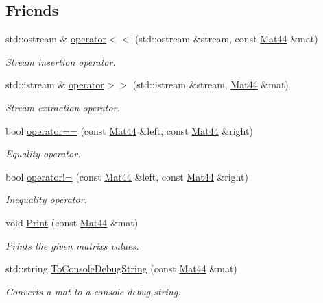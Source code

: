 \subsection*{Friends}
\begin{DoxyCompactItemize}
\item 
std\+::ostream \& \hyperlink{classgfxmath_1_1_mat44_a3fe91a98667ad47a13792a3910edc689}{operator$<$$<$} (std\+::ostream \&stream, const \hyperlink{classgfxmath_1_1_mat44}{Mat44} \&mat)
\begin{DoxyCompactList}\small\item\em Stream insertion operator. \end{DoxyCompactList}\item 
std\+::istream \& \hyperlink{classgfxmath_1_1_mat44_addb2505fe2722a6fe1e02f4f7fefbae6}{operator$>$$>$} (std\+::istream \&stream, \hyperlink{classgfxmath_1_1_mat44}{Mat44} \&mat)
\begin{DoxyCompactList}\small\item\em Stream extraction operator. \end{DoxyCompactList}\item 
bool \hyperlink{classgfxmath_1_1_mat44_af4dc2dcc368fc35c6fd456a0bb87f7a2}{operator==} (const \hyperlink{classgfxmath_1_1_mat44}{Mat44} \&left, const \hyperlink{classgfxmath_1_1_mat44}{Mat44} \&right)
\begin{DoxyCompactList}\small\item\em Equality operator. \end{DoxyCompactList}\item 
bool \hyperlink{classgfxmath_1_1_mat44_acbc1598a85e4db1071aa8b4f005ad422}{operator!=} (const \hyperlink{classgfxmath_1_1_mat44}{Mat44} \&left, const \hyperlink{classgfxmath_1_1_mat44}{Mat44} \&right)
\begin{DoxyCompactList}\small\item\em Inequality operator. \end{DoxyCompactList}\item 
void \hyperlink{classgfxmath_1_1_mat44_a29435fda8e5d65db573dadafee977651}{Print} (const \hyperlink{classgfxmath_1_1_mat44}{Mat44} \&mat)
\begin{DoxyCompactList}\small\item\em Prints the given matrix\textquotesingle{}s values. \end{DoxyCompactList}\item 
std\+::string \hyperlink{classgfxmath_1_1_mat44_a5d850a4033c3297037241bf1c9ba6223}{To\+Console\+Debug\+String} (const \hyperlink{classgfxmath_1_1_mat44}{Mat44} \&mat)
\begin{DoxyCompactList}\small\item\em Converts a mat to a console debug string. \end{DoxyCompactList}\end{DoxyCompactItemize}
